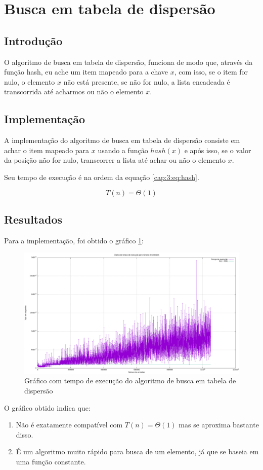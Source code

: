 \section{Busca em tabela de dispersão} \label{cap:3:section:hash}

\subsection{Introdução}

O algoritmo de busca em tabela de dispersão, funciona de modo que, através da função
hash, eu ache um item mapeado para a chave $x$, com isso, se o item for nulo, o elemento
$x$ não está presente, se não for nulo, a lista encadeada é transcorrida até acharmos ou não
o elemento $x$.

\subsection{Implementação}

A implementação do algoritmo de busca em tabela de dispersão consiste em achar o item mapeado para
$x$ usando a função $hash(x)$ e após isso, se o valor da posição não for nulo, transcorrer a lista
até achar ou não o elemento $x$.



Seu tempo de execução é na ordem da equação \ref{cap:3:eq:hash}.

\begin{equation} \label{cap:3:eq:bTree}
    T(n) = \Theta(1)
\end{equation}

\subsection{Resultados}

Para a implementação, foi obtido o gráfico \ref{cap:3:graph:hash}:

\begin{figure}[h]
    \centering
    \includegraphics[width=\textwidth]{image/graphics/hash.png}
    \caption{Gráfico com tempo de execução do algoritmo de busca em tabela de dispersão}
    \label{cap:3:graph:hash}
\end{figure}

O gráfico obtido indica que:

\begin{enumerate}
    \item Não é exatamente compatível com $T(n) = \Theta(1)$ mas se aproxima bastante disso.
    \item É um algoritmo muito rápido para busca de um elemento, já que se baseia em uma função constante.
\end{enumerate}
